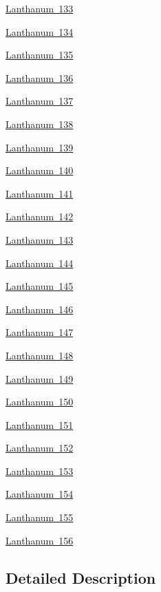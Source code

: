 \begin{DoxyCompactItemize}
\item 
\mbox{\hyperlink{group___isotope_const-_lanthanum-_la133}{Lanthanum 133}}
\item 
\mbox{\hyperlink{group___isotope_const-_lanthanum-_la134}{Lanthanum 134}}
\item 
\mbox{\hyperlink{group___isotope_const-_lanthanum-_la135}{Lanthanum 135}}
\item 
\mbox{\hyperlink{group___isotope_const-_lanthanum-_la136}{Lanthanum 136}}
\item 
\mbox{\hyperlink{group___isotope_const-_lanthanum-_la137}{Lanthanum 137}}
\item 
\mbox{\hyperlink{group___isotope_const-_lanthanum-_la138}{Lanthanum 138}}
\item 
\mbox{\hyperlink{group___isotope_const-_lanthanum-_la139}{Lanthanum 139}}
\item 
\mbox{\hyperlink{group___isotope_const-_lanthanum-_la140}{Lanthanum 140}}
\item 
\mbox{\hyperlink{group___isotope_const-_lanthanum-_la141}{Lanthanum 141}}
\item 
\mbox{\hyperlink{group___isotope_const-_lanthanum-_la142}{Lanthanum 142}}
\item 
\mbox{\hyperlink{group___isotope_const-_lanthanum-_la143}{Lanthanum 143}}
\item 
\mbox{\hyperlink{group___isotope_const-_lanthanum-_la144}{Lanthanum 144}}
\item 
\mbox{\hyperlink{group___isotope_const-_lanthanum-_la145}{Lanthanum 145}}
\item 
\mbox{\hyperlink{group___isotope_const-_lanthanum-_la146}{Lanthanum 146}}
\item 
\mbox{\hyperlink{group___isotope_const-_lanthanum-_la147}{Lanthanum 147}}
\item 
\mbox{\hyperlink{group___isotope_const-_lanthanum-_la148}{Lanthanum 148}}
\item 
\mbox{\hyperlink{group___isotope_const-_lanthanum-_la149}{Lanthanum 149}}
\item 
\mbox{\hyperlink{group___isotope_const-_lanthanum-_la150}{Lanthanum 150}}
\item 
\mbox{\hyperlink{group___isotope_const-_lanthanum-_la151}{Lanthanum 151}}
\item 
\mbox{\hyperlink{group___isotope_const-_lanthanum-_la152}{Lanthanum 152}}
\item 
\mbox{\hyperlink{group___isotope_const-_lanthanum-_la153}{Lanthanum 153}}
\item 
\mbox{\hyperlink{group___isotope_const-_lanthanum-_la154}{Lanthanum 154}}
\item 
\mbox{\hyperlink{group___isotope_const-_lanthanum-_la155}{Lanthanum 155}}
\item 
\mbox{\hyperlink{group___isotope_const-_lanthanum-_la156}{Lanthanum 156}}
\end{DoxyCompactItemize}


\subsection{Detailed Description}
